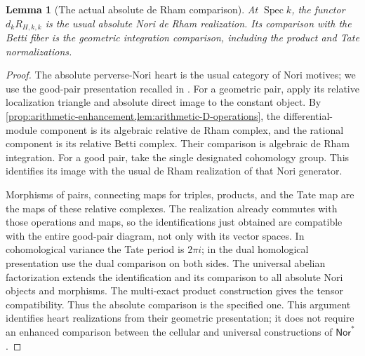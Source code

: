 \documentclass[11pt]{article}
\numberwithin{equation}{section}
\newtheorem{lemma}[lemma]{Lemma}
\theoremstyle{definition}
\theoremstyle{remark}
\newcommand{\Spec}{\operatorname{Spec}}
\begin{document}
\begin{lemma}[The actual absolute de Rham comparison]
\label{lem:absolute-dR-comparison}
At $\Spec k$, the functor $d_kR_{H,k,k}$ is the usual absolute Nori
de Rham realization. Its comparison with the Betti fiber is the
geometric integration comparison, including the product and Tate
normalizations.
\end{lemma}
\begin{proof}
The absolute perverse-Nori heart is the usual category of Nori motives;
we use the good-pair presentation recalled in
\cite[\S1.2]{Tubach}. For a geometric pair, apply its relative
localization triangle and absolute direct image to the constant object.
By \cref{prop:arithmetic-enhancement,lem:arithmetic-D-operations}, the
differential-module component is its algebraic relative de Rham complex,
and the rational component is its relative Betti complex. Their
comparison is algebraic de Rham integration. For a good pair, take the
single designated cohomology group. This identifies its image with the
usual de Rham realization of that Nori generator.

Morphisms of pairs, connecting maps for triples, products, and the Tate
map are the maps of these relative complexes. The realization already
commutes with those operations and maps, so the identifications just
obtained are compatible with the entire good-pair diagram, not only
with its vector spaces. In cohomological variance the Tate period is
$2\pi i$; in the dual homological presentation use the dual comparison
on both sides. The universal abelian factorization extends the
identification and its comparison to all absolute Nori objects and
morphisms. The multi-exact product construction gives the tensor
compatibility. Thus the absolute comparison is the specified one.
This argument identifies heart realizations from their geometric
presentation; it does not require an enhanced comparison between the
cellular and universal constructions of $\mathsf{Nor}^*$.
\end{proof}
\end{document}
